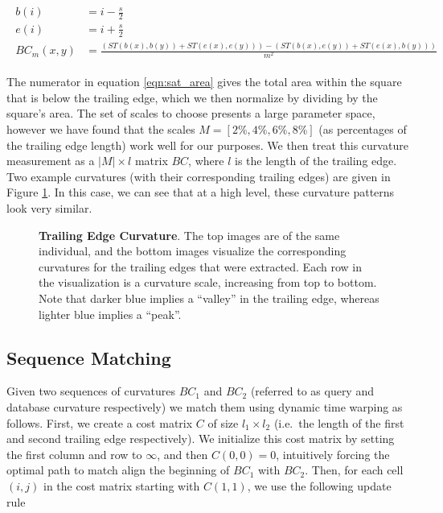 \begin{align} \label{eqn:sat_area}
\begin{split}
b(i) &= i - \frac{s}{2}\\
e(i) &= i + \frac{s}{2}\\
BC_m(x,y) &= \frac{(ST(b(x), b(y)) + ST(e(x), e(y))) - (ST(b(x), e(y)) + ST(e(x), b(y)))}{m^2}
\end{split}
\end{align}

The numerator in equation \eqref{eqn:sat_area} gives the total area within the square that is below the trailing edge, which we then normalize by dividing by the square's area.
The set of scales to choose presents a large parameter space, however we have found that the scales $M = [2\%, 4\%, 6\%, 8\%]$ (as percentages of the trailing edge length) work well for our purposes.
We then treat this curvature measurement as a $|M| \times l$ matrix $BC$, where $l$ is the length of the trailing edge.
Two example curvatures (with their corresponding trailing edges) are given in Figure \ref{fig:example_curv}.
In this case, we can see that at a high level, these curvature patterns look very similar.

\begin{figure}[t]%
\centering
{}
\newline
{}
\caption{\textbf{Trailing Edge Curvature}. The top images are of the same individual, and the bottom images visualize the corresponding curvatures for the trailing edges that were extracted. Each row in the visualization is a curvature scale, increasing from top to bottom. Note that darker blue implies a ``valley'' in the trailing edge, whereas lighter blue implies a ``peak''.}
\label{fig:example_curv}
\end{figure}

\subsection{Sequence Matching}

Given two sequences of curvatures $BC_1$ and $BC_2$ (referred to as query and database curvature respectively) we match them using dynamic time warping as follows.
First, we create a cost matrix $C$ of size $l_1 \times l_2$ (i.e.\ the length of the first and second trailing edge respectively). 
We initialize this cost matrix by setting the first column and row to $\infty$, and then $C(0,0) = 0$, intuitively forcing the optimal path to match align the beginning of $BC_1$ with $BC_2$.
Then, for each cell $(i,j)$ in the cost matrix starting with $C(1,1)$, we use the following update rule

